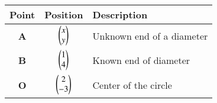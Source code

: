 \begin{tabular}[12pt]{|c|c|l|}
    \hline
	\textbf{Point} & \textbf{Position} & \textbf{Description}\\ 
    \hline
	\textbf{A} & $\begin{pmatrix}x \\ y\end{pmatrix}$ & Unknown end of a diameter \\
    \hline 
	\textbf{B} & $\begin{pmatrix}1 \\ 4\end{pmatrix}$ & Known end of diameter \\
    \hline
	\textbf{O} & $\begin{pmatrix}2 \\ -3\end{pmatrix}$ & Center of the circle \\
    \hline   
    \end{tabular}
